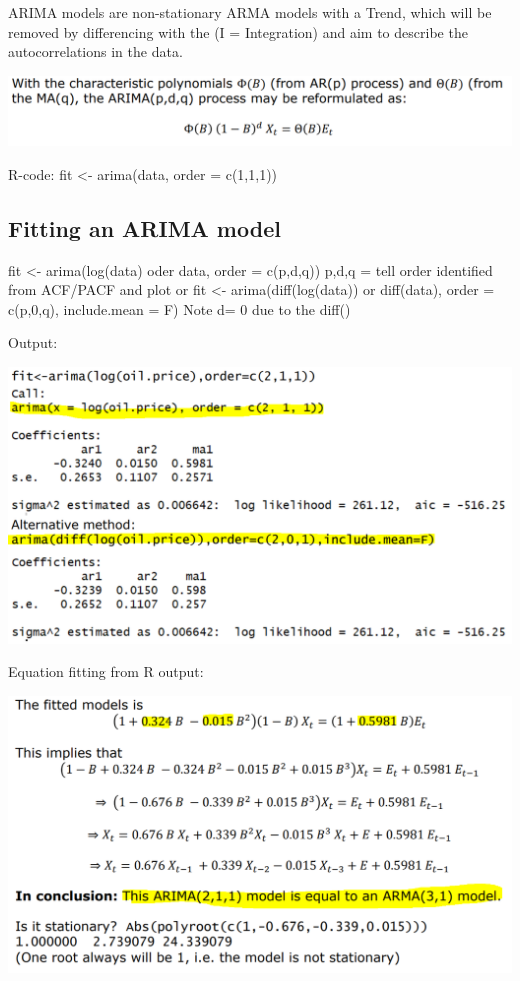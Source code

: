 \documentclass[
]{article}
\begin{document}
ARIMA models are non-stationary ARMA models with a Trend, which will be
removed by differencing with the (I = Integration) and aim to describe
the autocorrelations in the data.

\includegraphics[width=0.5\linewidth]{form}

R-code: fit \textless- arima(data, order = c(1,1,1))

\hypertarget{fitting-an-arima-model}{%
\subsection{Fitting an ARIMA model}\label{fitting-an-arima-model}}

fit \textless- arima(log(data) oder data, order = c(p,d,q)) p,d,q = tell
order identified from ACF/PACF and plot or fit \textless-
arima(diff(log(data)) or diff(data), order = c(p,0,q), include.mean = F)
Note d= 0 due to the diff()

Output:

\includegraphics[width=1\linewidth]{fitarima}

Equation fitting from R output:

\includegraphics[width=1\linewidth]{equ}
\end{document}
